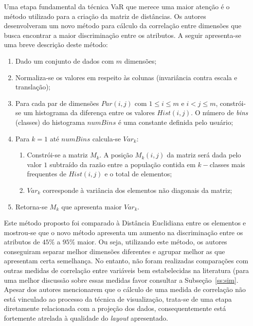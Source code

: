 Uma etapa fundamental da técnica VaR que merece uma maior atenção é o método utilizado para a criação da matriz de distâncias. Os autores desenvolveram um novo método para cálculo da correlação entre dimensões que busca encontrar a maior discriminação entre os atributos. A seguir apresenta-se uma breve  descrição deste método:

\begin{enumerate}
   
    \item Dado um conjunto de dados com $m$ dimensões; 
    \item Normaliza-se os valores em respeito às colunas (invariância contra escala e translação);
    \item Para cada par de dimensões $Par(i,j)$ com $1 \leq i \leq m$ e $i < j \leq m$, constrói-se um histograma da diferença entre os valores $Hist(i,j)$. O número de \emph{bins} (classes) do histograma $numBins$ é uma constante definida pelo usuário;
    \item Para $k = 1$ até $numBins$ calcula-se $Var_k$:
    \begin{enumerate}
        \item Constrói-se a matriz $M_k$. A posição $M_k(i,j)$ da matriz será dada pelo valor $1$ subtraído da razão entre a população contida em $k-$classes mais frequentes de $Hist(i,j)$ e o total de elementos;
        \item $Var_k$ corresponde à variância dos elementos não diagonais da matriz;
    \end{enumerate}
\item Retorna-se $M_k$ que apresenta maior $Var_k$.

\end{enumerate}

Este método proposto foi comparado à Distância Euclidiana entre os elementos e mostrou-se que o novo método apresenta um aumento na discriminação entre os atributos de $45\%$ a $95\%$ maior. Ou seja, utilizando este método, os autores conseguiram separar melhor dimensões diferentes e agrupar melhor as que apresentam certa semelhança. No entanto, não foram realizadas comparações com outras medidas de correlação entre variáveis bem estabelecidas na  literatura (para uma melhor discussão sobre essas medidas favor consultar a Subseção~\ref{ss:sim}. Apesar dos autores mencionarem que o cálculo de uma medida de correlação não está vinculado ao processo da técnica de visualização, trata-se de uma etapa diretamente relacionada com a projeção dos dados, consequentemente está fortemente atrelada à qualidade do \emph{layout} apresentado.

